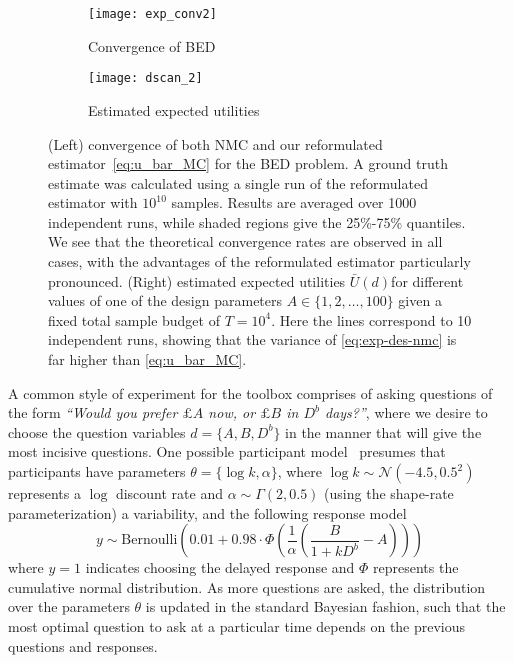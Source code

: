 \begin{figure}[t]
	\centering
	\begin{subfigure}[b]{0.49\textwidth}
		\centering
		\texttt{[image: exp\_conv2]}
		\caption{Convergence of BED\label{fig:exp-conv}}
	\end{subfigure}
		\begin{subfigure}[b]{0.49\textwidth}
			\centering
			\texttt{[image: dscan\_2]}
			\caption{Estimated expected utilities \label{fig:exp-d-scan}}
		\end{subfigure}
		\vspace{5pt}
	\caption{(Left) convergence of both NMC and our reformulated
		estimator~\eqref{eq:u_bar_MC} for the BED problem.
		A ground truth estimate was calculated using a single run of the reformulated
		estimator with $10^{10}$ samples.
		Results are averaged over 1000 independent runs, while shaded regions give the 25\%-75\% quantiles. We
		see that the theoretical convergence rates are observed in all cases,
		with the advantages of the reformulated estimator particularly pronounced.
		(Right) estimated expected utilities $\bar{U}(d)$for 
		different values of one of the design parameters $A \in \{1,2,\dots,100\}$ given a fixed total
		sample budget of $T=10^4$.  Here the lines correspond to 10 independent runs, showing
		that the variance of \eqref{eq:exp-des-nmc} is far higher than \eqref{eq:u_bar_MC}.
		}
\end{figure}

A common style of experiment for the toolbox comprises of asking questions of the form 
\emph{``Would you prefer $\pounds A$ now, or $\pounds B$ in $D^b$ days?''}, where we desire
to choose the question  variables $d = \{A,B,D^b\}$ in the manner that will give the most 
incisive questions.  One possible participant model~\citep{vincent2016hierarchical}
presumes that participants have parameters $\theta=\{\log k,\alpha\}$, where $\log k \sim \mathcal{N}(-4.5,0.5^2)$ 
represents a $\log$ discount rate and $\alpha\sim \Gamma(2,0.5)$ (using the shape-rate parameterization) a variability, and the following response model
\begin{equation}
\label{eq:design:darc}
y \sim \mathrm{Bernoulli} \left(0.01 + 0.98 \cdot \Phi\left(\frac{1}{\alpha} \left(\frac{B}{1+k D^b}-A\right)\right)\right)
\end{equation}
where $y=1$ indicates choosing the delayed response and $\Phi$ represents the 
cumulative normal distribution. As more questions are asked, the distribution 
over the parameters $\theta$ is updated in the standard Bayesian fashion, such
that the most optimal question to ask at a particular time depends on the previous questions
and responses.  

